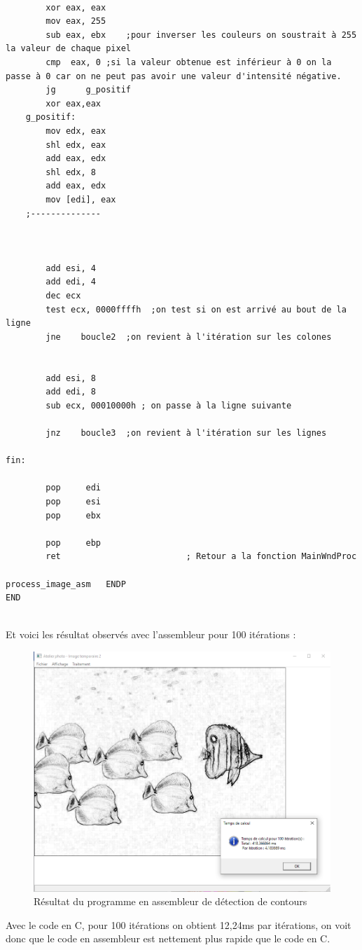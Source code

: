 \documentclass[11pt]{report}
\begin{document}
\begin{lstlisting}
		
		xor eax, eax
		mov	eax, 255
		sub eax, ebx	;pour inverser les couleurs on soustrait à 255 la valeur de chaque pixel
  		cmp  eax, 0 ;si la valeur obtenue est inférieur à 0 on la passe à 0 car on ne peut pas avoir une valeur d'intensité négative.
		jg		g_positif
		xor eax,eax
	g_positif:
		mov edx, eax
		shl edx, eax
		add eax, edx
		shl edx, 8
		add eax, edx
		mov	[edi], eax
	;--------------



		add esi, 4
		add edi, 4
		dec ecx
		test ecx, 0000ffffh  ;on test si on est arrivé au bout de la ligne
		jne	   boucle2	;on revient à l'itération sur les colones


		add esi, 8
		add edi, 8
		sub ecx, 00010000h ; on passe à la ligne suivante
 
		jnz    boucle3	;on revient à l'itération sur les lignes

fin:

		pop     edi
		pop     esi
		pop     ebx

		pop     ebp
        ret                         ; Retour a la fonction MainWndProc

process_image_asm   ENDP
END
 

\end{lstlisting}

\newpage




Et voici les résultat observés avec l'assembleur pour 100 itérations :
\begin{figure}[h]
\centering
\includegraphics[scale=0.4]{26552611_10215381438792953_598457361_n.png}
\caption{Résultat du programme en assembleur de détection de contours}
\label{}
\end{figure}



Avec le code en C, pour 100 itérations on obtient 12,24ms par itérations, on voit donc que le code en assembleur est nettement plus rapide que le code en C. 
\end{document}

